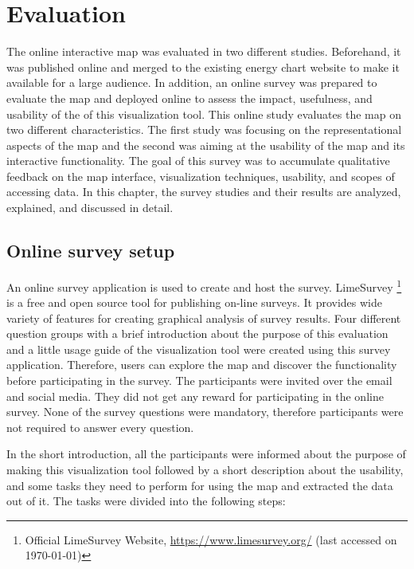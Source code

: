 \chapter{Evaluation}
\label{chap:evaluation}

The online interactive map was evaluated in two different studies. Beforehand, it was published online and merged to the existing energy chart website to make it available for a large audience. In addition, an online survey was prepared to evaluate the map and deployed online to assess the impact, usefulness, and usability of the of this visualization tool.  This online study evaluates the map on two different characteristics. The first study was focusing on the representational aspects of the map and the second was aiming at the usability of the map and its interactive functionality. The goal of this survey was to accumulate qualitative feedback on the map interface, visualization techniques, usability, and scopes of accessing data. In this chapter, the survey studies and their results are analyzed, explained, and discussed in detail.

\section{Online survey setup}
\label{chap:suveySetup}

An online survey application is used to create and host the survey. LimeSurvey \footnote{Official LimeSurvey Website, \url{https://www.limesurvey.org/} (last accessed on \today)} is a free and open source tool for publishing on-line surveys. It provides wide variety of features for creating graphical analysis of survey results. Four different question groups with a brief introduction about the purpose of this evaluation and a little usage guide of the visualization tool were created using this survey application. Therefore, users can explore the map and discover the functionality before participating in the survey. The participants were invited over the email and social media. They did not get any reward for participating in the online survey. None of the survey questions were mandatory, therefore participants were not required to answer every question. 

In the short introduction, all the participants were informed about the purpose of making this visualization tool followed by a short description about the usability, and some tasks they need to perform for using the map and extracted the data out of it. The tasks were divided into the following steps:

